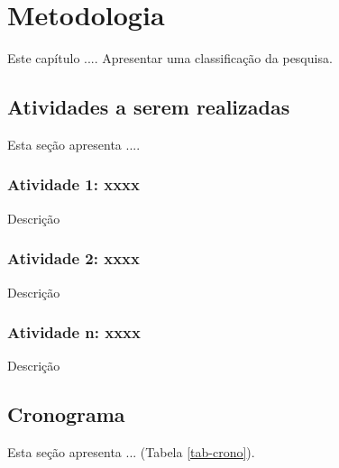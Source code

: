\chapter{Metodologia}
\label{metodo}

Este capítulo ....
Apresentar uma classificação da pesquisa.

\section{Atividades a serem realizadas}
Esta seção apresenta ....


\subsection{Atividade 1: xxxx}
Descrição

\subsection{Atividade 2: xxxx}
Descrição

\subsection{Atividade n: xxxx}
Descrição

\section{Cronograma}

Esta seção apresenta ... (Tabela \ref{tab-crono}).

